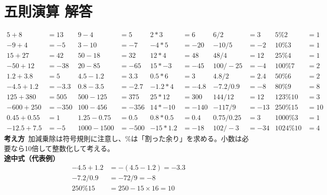 \documentclass[paper=b4j,landscape,twocolumn,fleqn]{jlreq}
\begin{document}
\section{五則演算 解答}
\begin{align*}
5+8&=13 & 9-4&=5 & 2*3&=6 & 6/2&=3 & 5\%2&=1\\
-9+4&=-5 & 3-10&=-7 & -4*5&=-20 & -10/5&=-2 & 10\%3&=1\\
15+27&=42 & 50-18&=32 & 12*4&=48 & 48/4&=12 & 25\%4&=1\\
-50+12&=-38 & 20-85&=-65 & 15*-3&=-45 & 100/-25&=-4 & 100\%7&=2\\
1.2+3.8&=5 & 4.5-1.2&=3.3 & 0.5*6&=3 & 4.8/2&=2.4 & 50\%6&=2\\
-4.5+1.2&=-3.3 & 0.8-3.5&=-2.7 & -1.2*4&=-4.8 & -7.2/0.9&=-8 & 80\%9&=8\\
125+380&=505 & 500-125&=375 & 25*12&=300 & 144/12&=12 & 123\%10&=3\\
-600+250&=-350 & 100-456&=-356 & 14*-10&=-140 & -117/9&=-13 & 250\%15&=10\\
0.45+0.55&=1 & 1.25-0.75&=0.5 & 0.8*0.5&=0.4 & 0.75/0.25&=3 & 1000\%3&=1\\
-12.5+7.5&=-5 & 1000-1500&=-500 & -15*1.2&=-18 & 102/-3&=-34 & 1024\%10&=4
\end{align*}
\textbf{考え方}\
加減乗除は符号規則に注意し、\%は「割った余り」を求める。小数は必要なら10倍して整数化して考える。\\
\textbf{途中式（代表例）}
\begin{align*}
-4.5+1.2&=-(4.5-1.2)= -3.3\\
-7.2/0.9&= -72/9=-8\\
250\%15&=250-15\times16=10
\end{align*}

\newpage
\end{document}
